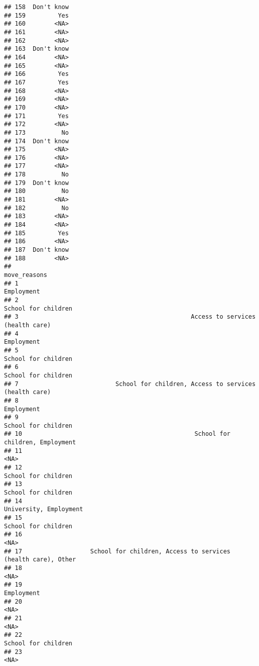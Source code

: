 \documentclass[
]{article}
\begin{document}
\begin{verbatim}
## 158  Don't know
## 159         Yes
## 160        <NA>
## 161        <NA>
## 162        <NA>
## 163  Don't know
## 164        <NA>
## 165        <NA>
## 166         Yes
## 167         Yes
## 168        <NA>
## 169        <NA>
## 170        <NA>
## 171         Yes
## 172        <NA>
## 173          No
## 174  Don't know
## 175        <NA>
## 176        <NA>
## 177        <NA>
## 178          No
## 179  Don't know
## 180          No
## 181        <NA>
## 182          No
## 183        <NA>
## 184        <NA>
## 185         Yes
## 186        <NA>
## 187  Don't know
## 188        <NA>
##                                                                      move_reasons
## 1                                                                      Employment
## 2                                                             School for children
## 3                                                Access to services (health care)
## 4                                                                      Employment
## 5                                                             School for children
## 6                                                             School for children
## 7                           School for children, Access to services (health care)
## 8                                                                      Employment
## 9                                                             School for children
## 10                                                School for children, Employment
## 11                                                                           <NA>
## 12                                                            School for children
## 13                                                            School for children
## 14                                                         University, Employment
## 15                                                            School for children
## 16                                                                           <NA>
## 17                   School for children, Access to services (health care), Other
## 18                                                                           <NA>
## 19                                                                     Employment
## 20                                                                           <NA>
## 21                                                                           <NA>
## 22                                                            School for children
## 23                                                                           <NA>

\end{verbatim}
\end{document}
